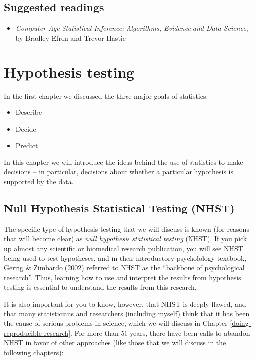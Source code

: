 \documentclass[]{book}
\providecommand{\tightlist}{%
  \setlength{\itemsep}{0pt}\setlength{\parskip}{0pt}}
\theoremstyle{definition}
\theoremstyle{definition}
\theoremstyle{definition}
\theoremstyle{remark}
\begin{document}
\section{Suggested readings}\label{suggested-readings-5}

\begin{itemize}
\tightlist
\item
  \emph{Computer Age Statistical Inference: Algorithms, Evidence and
  Data Science}, by Bradley Efron and Trevor Hastie
\end{itemize}

\chapter{Hypothesis testing}\label{hypothesis-testing}

In the first chapter we discussed the three major goals of statistics:

\begin{itemize}
\tightlist
\item
  Describe
\item
  Decide
\item
  Predict
\end{itemize}

In this chapter we will introduce the ideas behind the use of statistics
to make decisions -- in particular, decisions about whether a particular
hypothesis is supported by the data.

\section{Null Hypothesis Statistical Testing
(NHST)}\label{null-hypothesis-statistical-testing-nhst}

The specific type of hypothesis testing that we will discuss is known
(for reasons that will become clear) as \emph{null hypothesis
statistical testing} (NHST). If you pick up almost any scientific or
biomedical research publication, you will see NHST being used to test
hypotheses, and in their introductory psycholology textbook, Gerrig \&
Zimbardo (2002) referred to NHST as the ``backbone of psychological
research''. Thus, learning how to use and interpret the results from
hypothesis testing is essential to understand the results from this
research.

It is also important for you to know, however, that NHST is deeply
flawed, and that many statisticians and researchers (including myself)
think that it has been the cause of serious problems in science, which
we will discuss in Chapter \ref{doing-reproducible-research}. For more
than 50 years, there have been calls to abandon NHST in favor of other
approaches (like those that we will discuss in the following chapters):
\end{document}
